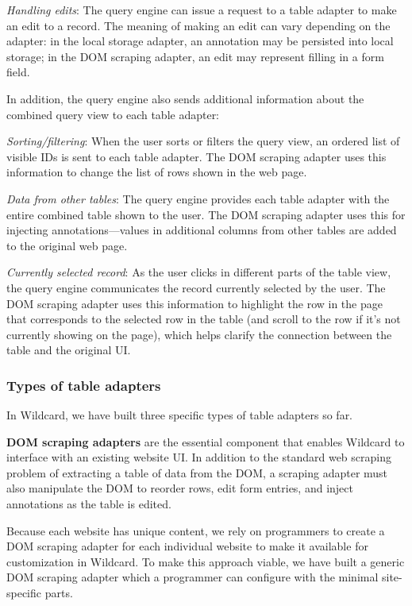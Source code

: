 \documentclass[sigplan,screen,10pt,anonymous,review]{acmart}
\begin{document}
\emph{Handling edits}: The query engine can issue a request to a table
adapter to make an edit to a record. The meaning of making an edit can
vary depending on the adapter: in the local storage adapter, an
annotation may be persisted into local storage; in the DOM scraping
adapter, an edit may represent filling in a form field.

In addition, the query engine also sends additional information about
the combined query view to each table adapter:

\emph{Sorting/filtering}: When the user sorts or filters the query view,
an ordered list of visible IDs is sent to each table adapter. The DOM
scraping adapter uses this information to change the list of rows shown
in the web page.

\emph{Data from other tables}: The query engine provides each table
adapter with the entire combined table shown to the user. The DOM
scraping adapter uses this for injecting annotations---values in
additional columns from other tables are added to the original web page.

\emph{Currently selected record}: As the user clicks in different parts
of the table view, the query engine communicates the record currently
selected by the user. The DOM scraping adapter uses this information to
highlight the row in the page that corresponds to the selected row in
the table (and scroll to the row if it's not currently showing on the
page), which helps clarify the connection between the table and the
original UI.

\hypertarget{types-of-table-adapters}{%
\subsubsection{Types of table adapters}\label{types-of-table-adapters}}

In Wildcard, we have built three specific types of table adapters so
far.

\textbf{DOM scraping adapters} are the essential component that enables
Wildcard to interface with an existing website UI. In addition to the
standard web scraping problem of extracting a table of data from the
DOM, a scraping adapter must also manipulate the DOM to reorder rows,
edit form entries, and inject annotations as the table is edited.

Because each website has unique content, we rely on programmers to
create a DOM scraping adapter for each individual website to make it
available for customization in Wildcard. To make this approach viable,
we have built a generic DOM scraping adapter which a programmer can
configure with the minimal site-specific parts.
\end{document}
